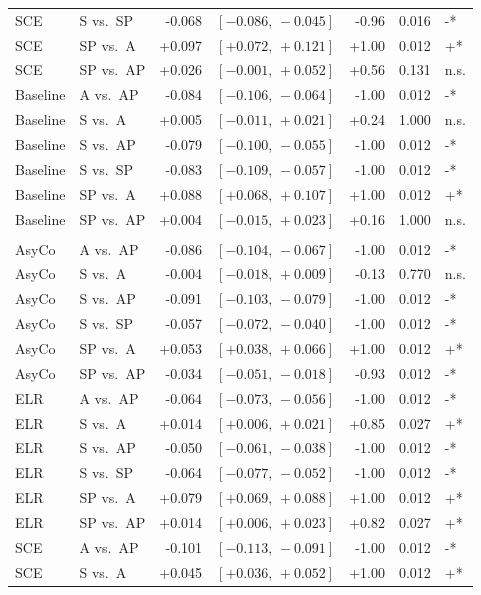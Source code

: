 \begin{table}[h!]
\begin{tabular}{llrrrrl}
SCE & S vs.\ SP & -0.068 & $[-0.086,\,-0.045]$ & -0.96 & 0.016 & -* \\
SCE & SP vs.\ A & +0.097 & $[+0.072,\,+0.121]$ & +1.00 & 0.012 & +* \\
SCE & SP vs.\ AP & +0.026 & $[-0.001,\,+0.052]$ & +0.56 & 0.131 & n.s. \\
Baseline & A vs.\ AP & -0.084 & $[-0.106,\,-0.064]$ & -1.00 & 0.012 & -* \\
Baseline & S vs.\ A & +0.005 & $[-0.011,\,+0.021]$ & +0.24 & 1.000 & n.s. \\
Baseline & S vs.\ AP & -0.079 & $[-0.100,\,-0.055]$ & -1.00 & 0.012 & -* \\
Baseline & S vs.\ SP & -0.083 & $[-0.109,\,-0.057]$ & -1.00 & 0.012 & -* \\
Baseline & SP vs.\ A & +0.088 & $[+0.068,\,+0.107]$ & +1.00 & 0.012 & +* \\
Baseline & SP vs.\ AP & +0.004 & $[-0.015,\,+0.023]$ & +0.16 & 1.000 & n.s. \\
\addlinespace
\multicolumn{7}{l}{\textit{Macro F1}} \\
AsyCo & A vs.\ AP & -0.086 & $[-0.104,\,-0.067]$ & -1.00 & 0.012 & -* \\
AsyCo & S vs.\ A & -0.004 & $[-0.018,\,+0.009]$ & -0.13 & 0.770 & n.s. \\
AsyCo & S vs.\ AP & -0.091 & $[-0.103,\,-0.079]$ & -1.00 & 0.012 & -* \\
AsyCo & S vs.\ SP & -0.057 & $[-0.072,\,-0.040]$ & -1.00 & 0.012 & -* \\
AsyCo & SP vs.\ A & +0.053 & $[+0.038,\,+0.066]$ & +1.00 & 0.012 & +* \\
AsyCo & SP vs.\ AP & -0.034 & $[-0.051,\,-0.018]$ & -0.93 & 0.012 & -* \\
ELR & A vs.\ AP & -0.064 & $[-0.073,\,-0.056]$ & -1.00 & 0.012 & -* \\
ELR & S vs.\ A & +0.014 & $[+0.006,\,+0.021]$ & +0.85 & 0.027 & +* \\
ELR & S vs.\ AP & -0.050 & $[-0.061,\,-0.038]$ & -1.00 & 0.012 & -* \\
ELR & S vs.\ SP & -0.064 & $[-0.077,\,-0.052]$ & -1.00 & 0.012 & -* \\
ELR & SP vs.\ A & +0.079 & $[+0.069,\,+0.088]$ & +1.00 & 0.012 & +* \\
ELR & SP vs.\ AP & +0.014 & $[+0.006,\,+0.023]$ & +0.82 & 0.027 & +* \\
SCE & A vs.\ AP & -0.101 & $[-0.113,\,-0.091]$ & -1.00 & 0.012 & -* \\
SCE & S vs.\ A & +0.045 & $[+0.036,\,+0.052]$ & +1.00 & 0.012 & +* \\

\end{tabular}
\end{table}
